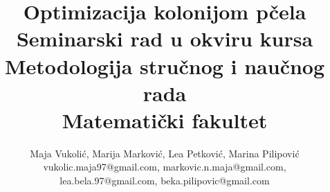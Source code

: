 \documentclass[a4paper]{article}
\begin{document}
\title{Optimizacija kolonijom pčela\\ \small{Seminarski rad u okviru kursa\\Metodologija stručnog i naučnog rada\\ Matematički fakultet}}

\author{Maja Vukolić, Marija Marković, Lea Petković, Marina Pilipović\\ vukolic.maja97@gmail.com, markovic.n.maja@gmail.com,\\
lea.bela.97@gmail.com, beka.pilipovic@gmail.com}


\maketitle
\end{document}

